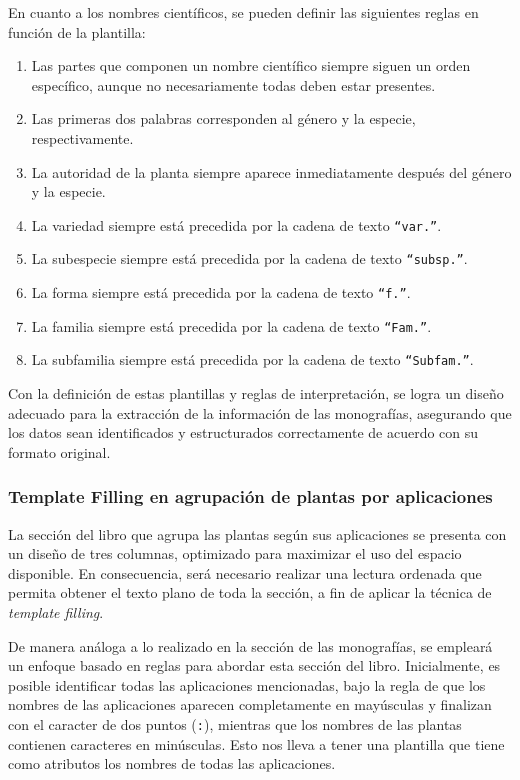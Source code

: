 En cuanto a los nombres científicos, se pueden definir las siguientes reglas en función de la plantilla:
\begin{enumerate}
    \item Las partes que componen un nombre científico siempre siguen un orden específico, aunque no necesariamente todas deben estar presentes.
    \item Las primeras dos palabras corresponden al género y la especie, respectivamente.
    \item La autoridad de la planta siempre aparece inmediatamente después del género y la especie.
    \item La variedad siempre está precedida por la cadena de texto \texttt{``var.''}.
    \item La subespecie siempre está precedida por la cadena de texto \texttt{``subsp.''}.
    \item La forma siempre está precedida por la cadena de texto \texttt{``f.''}.
    \item La familia siempre está precedida por la cadena de texto \texttt{``Fam.''}.
    \item La subfamilia siempre está precedida por la cadena de texto \texttt{``Subfam.''}.
\end{enumerate}

Con la definición de estas plantillas y reglas de interpretación, se logra un diseño adecuado para 
la extracción de la información de las monografías, asegurando que los datos sean identificados y 
estructurados correctamente de acuerdo con su formato original.


\subsubsection{Template Filling en agrupación de plantas por aplicaciones}
La sección del libro que agrupa las plantas según sus aplicaciones se presenta con un diseño de 
tres columnas, optimizado para maximizar el uso del espacio disponible. En consecuencia, será 
necesario realizar una lectura ordenada que permita obtener el texto plano de toda la sección, 
a fin de aplicar la técnica de \textit{template filling}.

De manera análoga a lo realizado en la sección de las monografías, se empleará un enfoque basado 
en reglas para abordar esta sección del libro. Inicialmente, es posible identificar todas las aplicaciones 
mencionadas, bajo la regla de que los nombres de las aplicaciones aparecen completamente en mayúsculas y 
finalizan con el caracter de dos puntos (\texttt{:}), mientras que los nombres de las plantas contienen caracteres en minúsculas.
Esto nos lleva a tener una plantilla que tiene como atributos los nombres de todas las aplicaciones.

